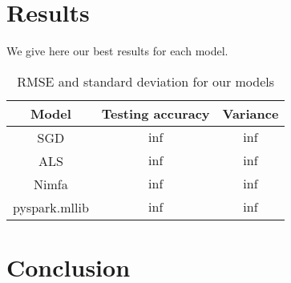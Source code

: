 \documentclass[a4paper]{article}
\begin{document}
\section{Results}
We give here our best results for each model.
\mbox{}\\
\begin{table}[h!]
  \centering
  \begin{tabular}{|c|c|c|}
    \hline
    \textbf{Model} & \textbf{Testing accuracy} & \textbf{Variance}\\
    \hline
    SGD & \(\inf\) & \(\inf\)\\
    \hline
    ALS & \(\inf\) & \(\inf\)\\
    \hline
    Nimfa & \(\inf\) & \(\inf\)\\
    \hline
    pyspark.mllib & \(\inf\) & \(\inf\)\\
    \hline
  \end{tabular}
  \caption{RMSE and standard deviation for our models}
  \label{tab:table 1}
\end{table}

\section{Conclusion}
\end{document}

